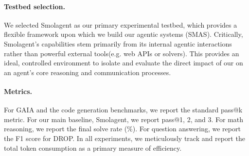 \paragraph{Testbed selection.}
We selected Smolagent as our primary experimental testbed, which provides a flexible framework upon which we build our agentic systems (SMAS). Critically, Smolagent's capabilities stem primarily from its internal agentic interactions rather than powerful external tools(e.g. web APIs or solvers). This provides an ideal, controlled environment to isolate and evaluate the direct impact of our \method on an agent's core reasoning and communication processes.



\paragraph{Metrics.}
For GAIA and the code generation benchmarks, we report the standard pass@k metric.
For our main baseline, Smolagent, we report pass@1, 2, and 3.
For math reasoning, we report the final solve rate (\%).
For question answering, we report the F1 score for DROP.
In all experiments, we meticulously track and report the total token consumption as a primary measure of efficiency.




